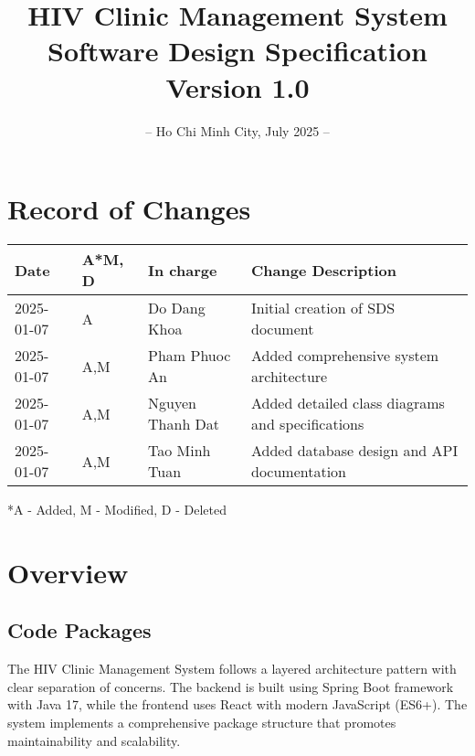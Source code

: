 \documentclass[12pt,a4paper]{article}
\title{
    \vspace{-2cm}
    \Huge\textbf{HIV Clinic Management System}\\
    \vspace{1cm}
    \Large\textbf{Software Design Specification}\\
    \vspace{2cm}
    \normalsize Version 1.0
}
\author{}
\date{
    \vspace{4cm}
    – Ho Chi Minh City, July 2025 –
}
\begin{document}
\maketitle
\thispagestyle{empty}

\newpage

\section*{Record of Changes}
\begin{longtable}{|p{3cm}|p{2cm}|p{3cm}|p{6cm}|}
\hline
\textbf{Date} & \textbf{A*M, D} & \textbf{In charge} & \textbf{Change Description} \\
\hline
2025-01-07 & A & Do Dang Khoa & Initial creation of SDS document \\
\hline
2025-01-07 & A,M & Pham Phuoc An    & Added comprehensive system architecture \\
\hline
2025-01-07 & A,M & Nguyen Thanh Dat & Added detailed class diagrams and specifications \\
\hline
2025-01-07 & A,M & Tao Minh Tuan & Added database design and API documentation \\
\hline
\end{longtable}

\footnotesize{*A - Added, M - Modified, D - Deleted}

\newpage

\tableofcontents

\newpage

\section{Overview}

\subsection{Code Packages}

The HIV Clinic Management System follows a layered architecture pattern with clear separation of concerns. The backend is built using Spring Boot framework with Java 17, while the frontend uses React with modern JavaScript (ES6+). The system implements a comprehensive package structure that promotes maintainability and scalability.
\end{document}
